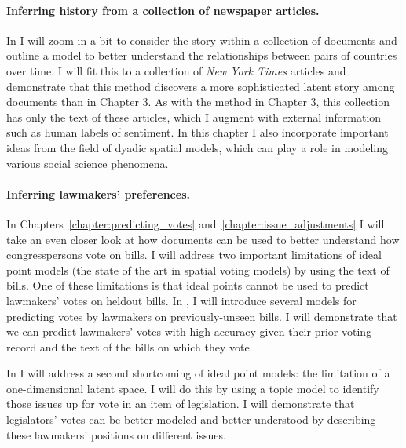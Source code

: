 \paragraph{Inferring history from a collection of newspaper articles.}
In  I will zoom in a bit to consider the
story within a collection of documents and outline a model to better
understand the relationships between pairs of countries over time.  I
will fit this to a collection of \emph{New York Times} articles and
demonstrate that this method discovers a more sophisticated latent
story among documents than in Chapter 3.  As with the method in
Chapter 3, this collection has only the text of these articles, which
I augment with external information such as human labels of sentiment.
In this chapter I also incorporate important ideas from the field of
dyadic spatial models, which can play a role in modeling various
social science phenomena.


\paragraph{Inferring lawmakers' preferences.}

In Chapters~\ref{chapter:predicting_votes}
and~\ref{chapter:issue_adjustments} I will take an even closer look at
how documents can be used to better understand how congresspersons vote on
bills.  I will address two important limitations of ideal point models
(the state of the art in spatial voting models) by using the text of
bills.  One of these limitations is that ideal points cannot be used
to predict lawmakers' votes on heldout bills.  In
, I will introduce several models for
predicting votes by lawmakers on previously-unseen bills.  I will
demonstrate that we can predict lawmakers' votes with high accuracy
given their prior voting record and the text of the bills on which
they vote.

In  I will address a second shortcoming of
ideal point models: the limitation of a one-dimensional latent space.
I will do this by using a topic model to identify those issues up for
vote in an item of legislation.  I will demonstrate that legislators'
votes can be better modeled and better understood by describing these
lawmakers' positions on different issues.


